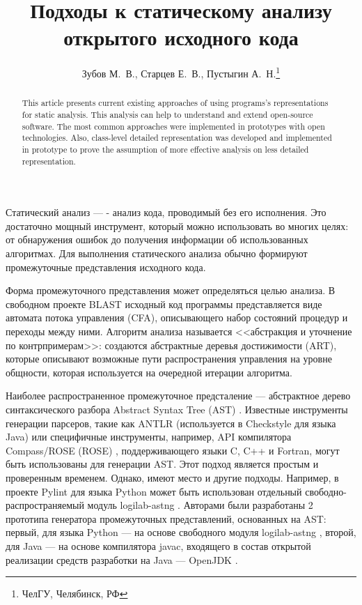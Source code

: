 \documentclass[10pt, a5paper]{article}
\begin{document}
\title{Подходы к статическому анализу открытого исходного кода}%

\author{Зубов М.~В., Старцев Е.~В., Пустыгин А.~Н.\footnote{ЧелГУ, Челябинск, РФ}}
\maketitle

\begin{abstract}
This article presents current existing approaches of using programs's representations for static analysis. This analysis can help to understand and extend open-source software. The most common approaches were implemented in prototypes with open technologies. Also, class-level detailed representation was developed and implemented in prototype to prove the assumption of more effective analysis on less detailed representation.
\end{abstract}

Статический анализ  --- - анализ кода, проводимый без его исполнения. Это достаточно мощный инструмент, который можно использовать во многих целях: от обнаружения ошибок до получения информации об использованных алгоритмах. Для выполнения статического анализа обычно формируют промежуточные представления исходного кода.

Форма промежуточного представления может определяться целью анализа. В свободном проекте BLAST \cite{Zubov1} исходный код программы представляется виде автомата потока управления (CFA), описывающего набор состояний процедур и переходы между ними. Алгоритм анализа называется <<абстракция и уточнение по  контрпримерам>>: создаются абстрактные деревья достижимости (ART), которые описывают возможные пути распространения управления на уровне общности, которая используется на очередной итерации алгоритма.

Наиболее распространенное промежуточное предсталение — абстрактное дерево синтаксического разбора Abstract Syntax Tree (AST) \cite{Zubov2}. Известные инструменты генерации парсеров, такие как ANTLR \cite{Zubov3} (используется в Checkstyle \cite{Zubov4} для языка Java) или специфичные инструменты, например, API компилятора Compass/ROSE (ROSE) \cite{Zubov5}, поддерживающего языки C, C++ и Fortran, могут быть использованы для генерации AST. Этот подход является простым и проверенным временем. Однако, имеют место и другие подходы. Например, в проекте Pylint \cite{Zubov6} для языка Python может быть использован отдельный свободно-распространяемый модуль logilab-astng \cite{Zubov7}. Авторами были разработаны 2 прототипа генератора промежуточных представлений, основанных на AST: первый, для языка Python --- на основе свободного модуля logilab-astng \cite{Zubov7}, второй, для Java --- на основе компилятора javac, входящего в состав открытой реализации средств разработки на Java --- OpenJDK \cite{Zubov8}.
\end{document}

